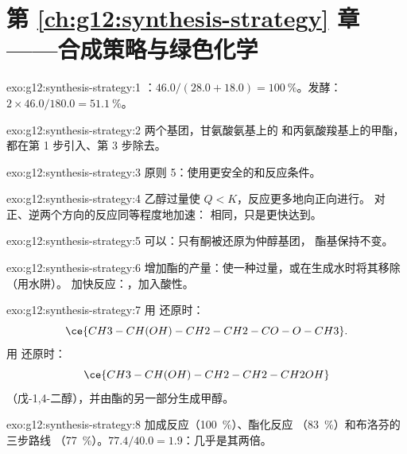 \section*{第 \ref{ch:g12:synthesis-strategy} 章——合成策略与绿色化学}

\begin{solution}{exo:g12:synthesis-strategy:1}
：$46.0/(28.0 + 18.0) = \qty{100}{\percent}$。发酵：
$2 \times 46.0/180.0 = \qty{51.1}{\percent}$。
\end{solution}

\begin{solution}{exo:g12:synthesis-strategy:2}
两个基团，甘氨酸氨基上的  和丙氨酸羧基上的甲酯，
都在第 1 步引入、第 3 步除去。
\end{solution}

\begin{solution}{exo:g12:synthesis-strategy:3}
原则 5：使用更安全的和反应条件。
\end{solution}

\begin{solution}{exo:g12:synthesis-strategy:4}
乙醇过量使 $Q < K$，反应更多地向正向进行。
对正、逆两个方向的反应同等程度地加速：
相同，只是更快达到。
\end{solution}

\begin{solution}{exo:g12:synthesis-strategy:5}
可以：只有酮被还原为仲醇基团，
酯基保持不变。
\end{solution}

\begin{solution}{exo:g12:synthesis-strategy:6}
增加酯的产量：使一种过量，或在生成水时将其移除（用水阱）。
加快反应：，加入酸性。
\end{solution}

\begin{solution}{exo:g12:synthesis-strategy:7}
用  还原时：
\[ \ce{CH3-CH(OH)-CH2-CH2-CO-O-CH3} . \]
用  还原时：
\[ \ce{CH3-CH(OH)-CH2-CH2-CH2OH} \]
（戊-1,4-二醇），并由酯的另一部分生成甲醇。
\end{solution}

\begin{solution}{exo:g12:synthesis-strategy:8}
加成反应（\qty{100}{\percent}）、酯化反应
（\qty{83}{\percent}）和布洛芬的三步路线
（\qty{77}{\percent}）。$77.4/40.0 = 1.9$：几乎是其两倍。
\end{solution}

